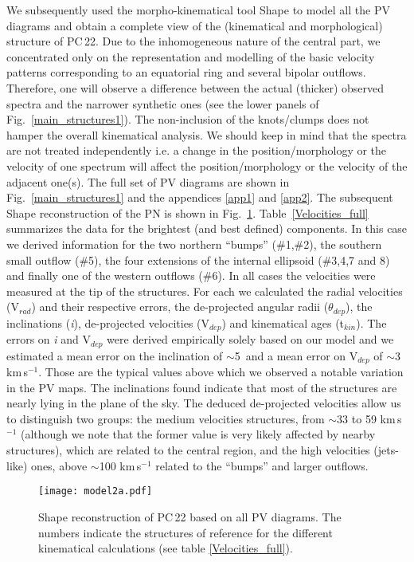 \documentclass[fleqn,usenatbib,useAMS]{mnras}
\begin{document}
We subsequently used the morpho-kinematical tool {\sc Shape}
\citep{Steffen2011} to model all the PV diagrams and obtain
a complete view of the (kinematical and morphological) structure
of PC\,22.
Due to the inhomogeneous nature of the central part, we concentrated only
on the representation and modelling of the basic velocity patterns
corresponding to an equatorial ring and several bipolar outflows.  
Therefore, one will observe a difference between the actual (thicker)
observed spectra and the narrower synthetic ones (see the lower panels
of Fig.~\ref{main_structures1}).  
The non-inclusion of the knots/clumps does not hamper the overall kinematical analysis. We should keep in mind that the spectra are not treated independently i.e. a change in the position/morphology or the velocity of one spectrum will affect the position/morphology or the velocity of the adjacent one(s).
The full set of PV diagrams are shown in Fig.~\ref{main_structures1} and the appendices \ref{app1} and \ref{app2}.
The subsequent {\sc Shape} reconstruction of the PN is shown in
Fig.~\ref{main_structures2}.
Table~\ref{Velocities_full} summarizes the data for the brightest (and best defined) components. In this case we derived information for the two northern ``bumps'' (\#1,\#2), the southern small outflow (\#5), the four extensions of the internal ellipsoid (\#3,4,7 and 8) and finally one of the western outflows (\#6).
In all cases the velocities were measured at the tip of the structures. For each we calculated the radial velocities (V$_{rad}$) and their respective errors, the de-projected angular radii ($\theta_{dep}$), the inclinations ({\it i}), de-projected velocities (V$_{dep}$) and kinematical ages (t$_{kin}$). The errors on {\it i} and V$_{dep}$ were derived empirically solely based on our model and we estimated a mean error on the inclination of $\sim$5\degr\, and  a mean error on V$_{dep}$ of $\sim$3 km\,s$^{-1}$. Those are the typical values above which we observed a notable variation in the PV maps. The inclinations found indicate that most of the structures are nearly lying in the plane of the sky. The deduced de-projected velocities allow us to distinguish two groups: the medium velocities structures, from  $\sim$33 to 59 km\,s$^{-1}$ (although we note that the former value is very likely affected by nearby structures), which are related to the central region, and the high velocities (jets-like) ones, above $\sim$100 km\,s$^{-1}$ related to the ``bumps'' and larger outflows.


\begin{figure}
\begin{center}
\texttt{[image: model2a.pdf]}
\caption{
{\sc Shape} reconstruction of PC\,22 based on all PV diagrams.
The numbers indicate the structures of reference for the different
kinematical calculations (see table \ref{Velocities_full}).
}
\label{main_structures2}
\end{center}
\end{figure} 
\end{document}
